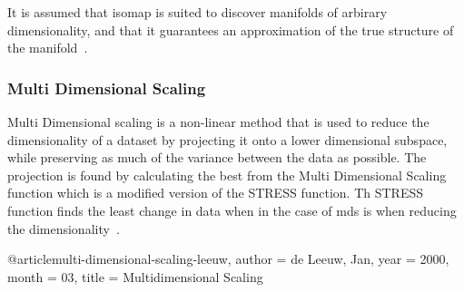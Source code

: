 It is assumed that \gls{isomap} is suited to discover manifolds of arbirary dimensionality, and that it guarantees an approximation of the true structure of the manifold~\cite{tennenbaum}.


\subsubsection{Multi Dimensional Scaling}\label{subsubsec:multi-dimensional-scaling}
Multi Dimensional scaling is a non-linear method that is used to reduce the dimensionality of a dataset by projecting it onto a lower dimensional subspace, while preserving as much of the variance between the data as possible. The projection is found by calculating the best from the Multi Dimensional Scaling function which is a modified version of the STRESS function. Th STRESS function finds the least change in data when in the case of \gls{mds} is when reducing the dimensionality~\cite{multi-dimensional-scaling-leeuw}.



@article{multi-dimensional-scaling-leeuw,
    author = {de Leeuw, Jan},
    year = {2000},
    month = {03},
    title = {Multidimensional Scaling}
}




